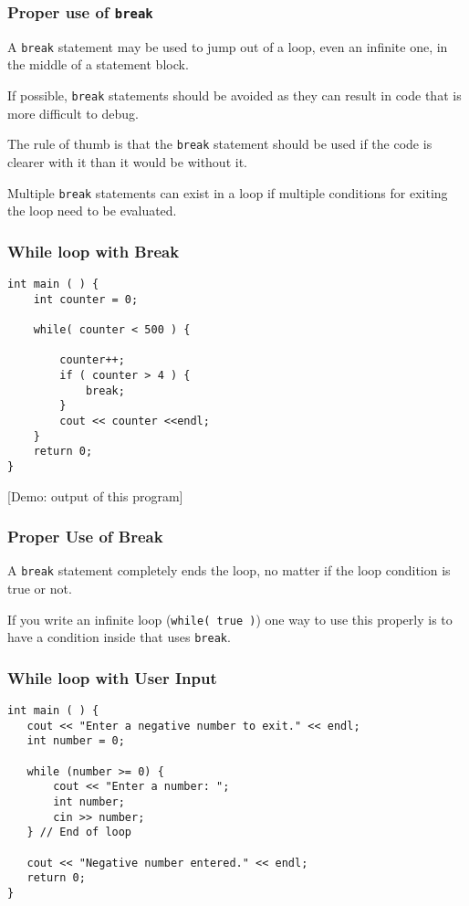 \begin{frame}
\frametitle{Proper use of \texttt{break}}

A \texttt{break} statement may be used to jump out of a loop, even an infinite one, in the middle of a statement block.

If possible, \texttt{break} statements should be avoided as they can result in code that is more difficult to debug.

The rule of thumb is that the \texttt{break} statement should be used if the code is clearer with it than it would be without it.

Multiple \texttt{break} statements can exist in a loop if multiple conditions for exiting the loop need to be evaluated.

\end{frame}

\begin{frame}[fragile]
\frametitle{While loop with Break}

\begin{verbatim}
int main ( ) {
    int counter = 0;

    while( counter < 500 ) {
    
        counter++;
        if ( counter > 4 ) {
            break;
        }
        cout << counter <<endl;
    }
    return 0;
}
\end{verbatim}

[Demo: output of this program]

\end{frame}

\begin{frame}
\frametitle{Proper Use of Break}
A \texttt{break} statement completely ends the loop, no matter if the loop condition is true or not.

If you write an infinite loop (\texttt{while( true )}) one way to use this properly is to have a condition inside that uses \texttt{break}.

\end{frame}


\begin{frame}[fragile]
\frametitle{While loop with User Input}

\begin{verbatim}
int main ( ) {
   cout << "Enter a negative number to exit." << endl;
   int number = 0;
    
   while (number >= 0) {
       cout << "Enter a number: ";
       int number;
       cin >> number;
   } // End of loop
    
   cout << "Negative number entered." << endl;
   return 0;
}    

\end{verbatim}
\end{frame}


